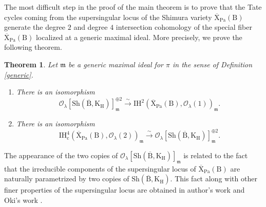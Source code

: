 \documentclass[10pt]{amsart}
\numberwithin{equation}{section}
\newtheorem{theorem}[equation]{Theorem}
\theoremstyle{definition}
\def\Pa{\mathrm{Pa}}
\def\calO{\mathcal{O}}
\def\fracm{\mathfrak{m}}
\def\rmc{\mathrm{c}}
\def\rmB{\mathrm{B}}
\def\rmH{\mathrm{H}}
\def\rmK{\mathrm{K}}
\def\rmX{\mathrm{X}}
\def\Sh{\mathrm{Sh}}
\begin{document}
The most difficult step in the proof of the main theorem is to prove that the Tate cycles coming from the supersingular locus of the Shimura variety $\overline{\rmX}_{\Pa}(\rmB)$ generate the degree $2$  and degree $4$ intersection cohomology of the special fiber $\overline{\rmX}_{\Pa}(\rmB)$ localized at a generic maximal ideal. More precisely, we prove the following theorem.

\begin{theorem}\label{intro-Tate}
Let $\fracm$ be a generic maximal ideal for $\pi$ in the sense of Definition \ref{generic}.
\begin{enumerate}
\item There is an isomorphism
\begin{equation*}
\calO_{\lambda}[\Sh(\overline{\rmB}, \rmK_{\rmH})]^{\oplus 2}_{\fracm} \xrightarrow{\sim}  \mathrm{IH}^{2}(\overline{\rmX}_{\Pa}(\rmB), \calO_{\lambda}(1))_{\fracm}.
\end{equation*}

\item There is an isomorphism
\begin{equation*}
 \mathrm{IH}^{4}_{\rmc}(\overline{\rmX}_{\Pa}(\rmB), \calO_{\lambda}(2))_{\fracm}\xrightarrow{\sim} \calO_{\lambda}[\Sh(\overline{\rmB}, \rmK_{\rmH})]^{\oplus 2}_{\fracm}.
\end{equation*}
\end{enumerate}
\end{theorem}

The appearance of the two copies of $\calO_{\lambda}[\Sh(\overline{\rmB}, \rmK_{\rmH})]_{\fracm}$ is related to the fact that the irreducible components of the supersingular locus of $\overline{\rmX}_{\Pa}(\rmB)$ are naturally parametrized by two copies of $\Sh(\overline{\rmB}, \rmK_{\rmH})$. This fact along with other finer properties of the supersingular locus are obtained in author's work \cite{Wanga, Wangb} and Oki's work \cite{Oki}.  
\end{document}
